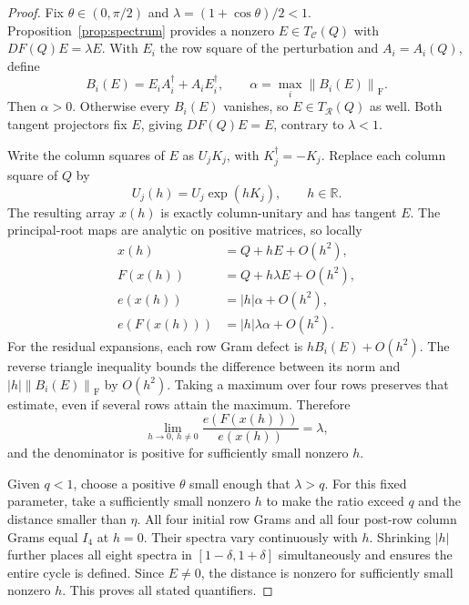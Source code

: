 \documentclass[11pt,a4paper]{article}
\newcommand{\R}{\mathbb R}
\newcommand{\adj}{^{\dagger}}
\newcommand{\fro}[1]{\left\|#1\right\|_{\mathrm F}}
\newcommand{\TR}{T_{\mathcal R}}
\newcommand{\TC}{T_{\mathcal C}}
\begin{document}
\begin{proof}
Fix $\theta\in(0,\pi/2)$ and $\lambda=(1+\cos\theta)/2<1$. Proposition~\ref{prop:spectrum} provides a nonzero $E\in\TC(Q)$ with $DF(Q)E=\lambda E$. With $E_i$ the row square of the perturbation and $A_i=A_i(Q)$, define
\begin{equation}
 B_i(E)=E_iA_i\adj+A_iE_i\adj,\qquad
 \alpha=\max_i\fro{B_i(E)}.
 \label{eq:alpha}
\end{equation}
Then $\alpha>0$. Otherwise every $B_i(E)$ vanishes, so $E\in\TR(Q)$ as well. Both tangent projectors fix $E$, giving $DF(Q)E=E$, contrary to $\lambda<1$.

Write the column squares of $E$ as $U_jK_j$, with $K_j\adj=-K_j$. Replace each column square of $Q$ by
\begin{equation}
 U_j(h)=U_j\exp(hK_j),\qquad h\in\R.
 \label{eq:curve}
\end{equation}
The resulting array $x(h)$ is exactly column-unitary and has tangent $E$. The principal-root maps are analytic on positive matrices, so locally
\begin{align}
 x(h)&=Q+hE+O(h^2),\\
 F(x(h))&=Q+h\lambda E+O(h^2),\\
 e(x(h))&=|h|\alpha+O(h^2),\\
 e(F(x(h)))&=|h|\lambda\alpha+O(h^2).
 \label{eq:expansions}
\end{align}
For the residual expansions, each row Gram defect is $hB_i(E)+O(h^2)$. The reverse triangle inequality bounds the difference between its norm and $|h|\fro{B_i(E)}$ by $O(h^2)$. Taking a maximum over four rows preserves that estimate, even if several rows attain the maximum. Therefore
\begin{equation}
 \lim_{h\to0,\,h\ne0}\frac{e(F(x(h)))}{e(x(h))}=\lambda,
 \label{eq:ratio}
\end{equation}
and the denominator is positive for sufficiently small nonzero $h$.

Given $q<1$, choose a positive $\theta$ small enough that $\lambda>q$. For this fixed parameter, take a sufficiently small nonzero $h$ to make the ratio exceed $q$ and the distance smaller than $\eta$. All four initial row Grams and all four post-row column Grams equal $I_4$ at $h=0$. Their spectra vary continuously with $h$. Shrinking $|h|$ further places all eight spectra in $[1-\delta,1+\delta]$ simultaneously and ensures the entire cycle is defined. Since $E\ne0$, the distance is nonzero for sufficiently small nonzero $h$. This proves all stated quantifiers.
\end{proof}
\end{document}

